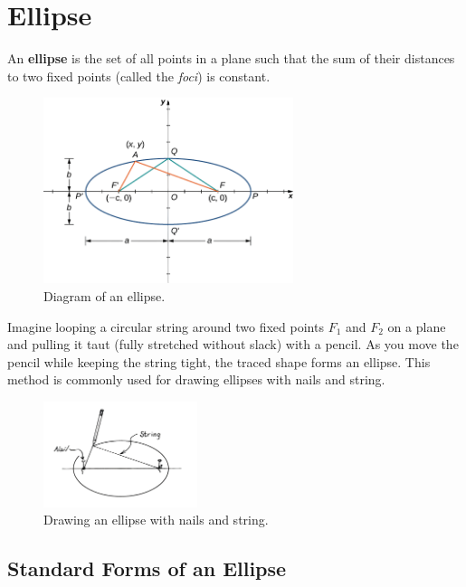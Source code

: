 \documentclass{article}
\begin{document}
\section*{Ellipse}
\begin{definitionbox}
An \textbf{ellipse} is the set of all points in a plane such that the sum of their distances to two fixed points (called the \textit{foci}) is constant.
\begin{figure}[H]
    \centering
    \includegraphics[width=0.65\textwidth]{ellipse.jpg}
    \caption{Diagram of an ellipse.}
\end{figure}

\begin{intuitionbox} 
    Imagine looping a circular string around two fixed points \( F_1 \) and \( F_2 \) on a plane and pulling it taut (fully stretched without slack) with a pencil. As you move the pencil while keeping the string tight, the traced shape forms an ellipse. This method is commonly used for drawing ellipses with nails and string.
    \begin{figure}[H]
        \centering
        \includegraphics[width=0.4\textwidth]{ellipse_string_example.png}
        \caption{Drawing an ellipse with nails and string.}
    \end{figure}
\end{intuitionbox}
\end{definitionbox}

\subsection*{Standard Forms of an Ellipse}
\end{document}

